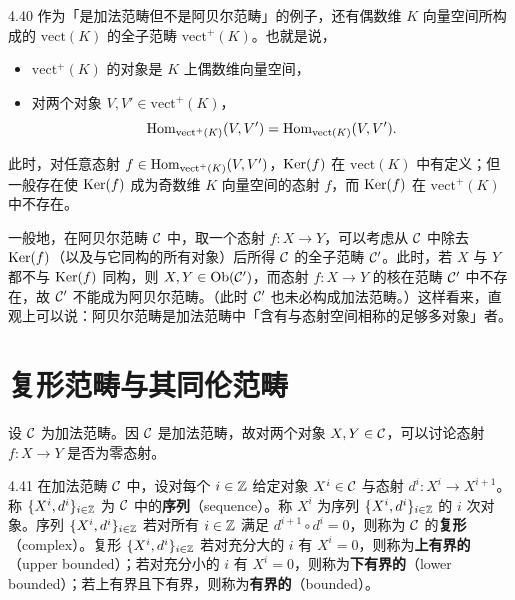 \begin{example}{4.40}
作为「是加法范畴但不是阿贝尔范畴」的例子，还有偶数维 $K$ 向量空间所构成的 $\mathrm{vect}(K)$ 的全子范畴 $\mathrm{vect}^+(K)$。也就是说，
\begin{itemize}
  \item $\mathrm{vect}^+(K)$ 的对象是 $K$ 上偶数维向量空间，
  \item 对两个对象 $V,V'\in\mathrm{vect}^+(K)$，
        \[ \operatorname{Hom}_{\mathrm{vect}^+(K)}(V,V')=\operatorname{Hom}_{\mathrm{vect}(K)}(V,V'). \]
\end{itemize}
此时，对任意态射 $f\in\operatorname{Hom}_{\mathrm{vect}^+(K)}(V,V')$，$\operatorname{Ker}(f)$ 在 $\mathrm{vect}(K)$ 中有定义；但一般存在使 $\operatorname{Ker}(f)$ 成为奇数维 $K$ 向量空间的态射 $f$，而 $\operatorname{Ker}(f)$ 在 $\mathrm{vect}^+(K)$ 中不存在。
\end{example}

一般地，在阿贝尔范畴 $\mathcal{C}$ 中，取一个态射 $f\colon X\to Y$，可以考虑从 $\mathcal{C}$ 中除去 $\operatorname{Ker}(f)$（以及与它同构的所有对象）后所得 $\mathcal{C}$ 的全子范畴 $\mathcal{C}'$。此时，若 $X$ 与 $Y$ 都不与 $\operatorname{Ker}(f)$ 同构，则 $X,Y\in\operatorname{Ob}(\mathcal{C}')$，而态射 $f\colon X\to Y$ 的核在范畴 $\mathcal{C}'$ 中不存在，故 $\mathcal{C}'$ 不能成为阿贝尔范畴。（此时 $\mathcal{C}'$ 也未必构成加法范畴。）这样看来，直观上可以说：阿贝尔范畴是加法范畴中「含有与态射空间相称的足够多对象」者。

\section{复形范畴与其同伦范畴}

设 $\mathcal{C}$ 为加法范畴。因 $\mathcal{C}$ 是加法范畴，故对两个对象 $X,Y\in\mathcal{C}$，可以讨论态射 $f\colon X\to Y$ 是否为零态射。

\begin{definition}{4.41}
在加法范畴 $\mathcal{C}$ 中，设对每个 $i\in\mathbb{Z}$ 给定对象 $X^i\in\mathcal{C}$ 与态射 $d^i\colon X^i\to X^{i+1}$。称 $\{X^i,d^i\}_{i\in\mathbb{Z}}$ 为 $\mathcal{C}$ 中的\textbf{序列}（sequence）。称 $X^i$ 为序列 $\{X^i,d^i\}_{i\in\mathbb{Z}}$ 的 $i$ 次对象。序列 $\{X^i,d^i\}_{i\in\mathbb{Z}}$ 若对所有 $i\in\mathbb{Z}$ 满足 $d^{i+1}\circ d^i=0$，则称为 $\mathcal{C}$ 的\textbf{复形}（complex）。复形 $\{X^i,d^i\}_{i\in\mathbb{Z}}$ 若对充分大的 $i$ 有 $X^i=0$，则称为\textbf{上有界的}（upper bounded）；若对充分小的 $i$ 有 $X^i=0$，则称为\textbf{下有界的}（lower bounded）；若上有界且下有界，则称为\textbf{有界的}（bounded）。
\end{definition}

